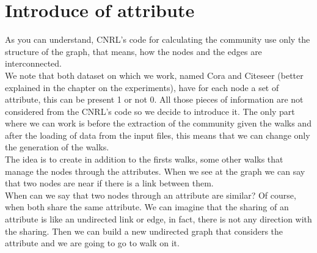 \documentclass[epsfig,a4paper,11pt,titlepage,twoside,openany]{book}
\begin{document}
\section{Introduce of attribute}
As you can understand, CNRL's code for calculating the community use only the structure of the graph, that means, how the nodes and the edges are interconnected.\\
We note that both dataset on which we work, named Cora and Citeseer (better explained in the chapter on the experiments), have for each node a set of attribute, this can be present 1 or not 0. All those pieces of information are not considered from the CNRL's code so we decide to introduce it. The only part where we can work is before the extraction of the community given the walks and after the loading of data from the input files, this means that we can change only the generation of the walks.\\
The idea is to create in addition to the firsts walks, some other walks that manage the nodes through the attributes. When we see at the graph we can say that two nodes are near if there is a link between them.\\
When can we say that two nodes through an attribute are similar? Of course, when both share the same attribute. We can imagine that the sharing of an attribute is like an undirected link or edge, in fact, there is not any direction with the sharing. Then we can build a new undirected graph that considers the attribute and we are going to go to walk on it.
%
\end{document}
